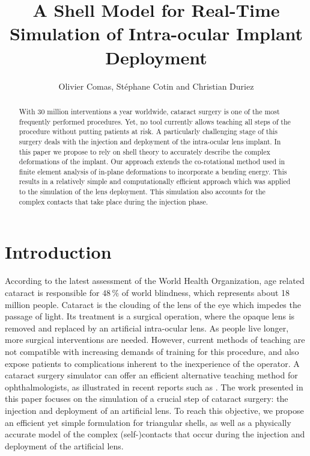 \documentclass{llncs}
\begin{document}
\title{A Shell Model for Real-Time Simulation of Intra-ocular Implant Deployment}
\author{Olivier Comas, St\'ephane Cotin and Christian Duriez}

\maketitle

\begin{abstract}
With 30 million interventions a year worldwide, cataract surgery is one of the most frequently performed procedures. Yet, no tool currently allows teaching all steps of the procedure without putting patients at risk. A particularly challenging stage of this surgery deals with the injection and deployment of the intra-ocular lens implant. In this paper we propose to rely on shell theory to accurately describe the complex deformations of the implant. Our approach extends the co-rotational method used in finite element analysis of in-plane deformations to incorporate a bending energy. This results in a relatively simple and computationally efficient approach which was applied to the simulation of the lens deployment. This simulation also accounts for the complex contacts that take place during the injection phase. 
\end{abstract}

\section{Introduction}
According to the latest assessment of the World Health Organization, age related cataract is responsible for $48\,\%$ of world blindness, which represents about 18 million people. Cataract is the clouding of the lens of the eye which impedes the passage of light. Its treatment is a surgical operation, where the opaque lens is removed and replaced by an artificial intra-ocular lens. As people live longer, more surgical interventions are needed. However, current methods of teaching are not compatible with increasing demands of training for this procedure, and also expose patients to complications inherent to the inexperience of the operator. A cataract surgery simulator can offer an efficient alternative teaching method for ophthalmologists, as illustrated in recent reports such as \cite{Feudner09}. The work presented in this paper focuses on the simulation of a crucial step of cataract surgery: the injection and deployment of an artificial lens. To reach this objective, we propose an efficient yet simple formulation for triangular shells, as well as a physically accurate model of the complex (self-)contacts that occur during the injection and deployment of the artificial lens. 
\end{document}
